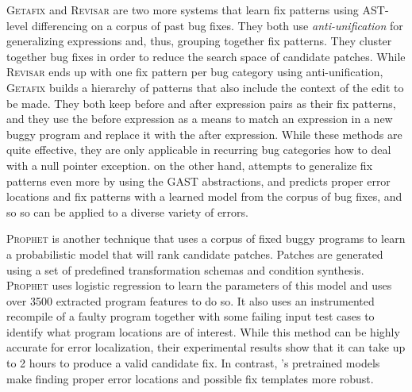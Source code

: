 \textsc{Getafix} \citep{Bader_2019} and 
\textsc{Revisar} \citep{Rolim_2018} are
two more systems that learn fix patterns 
using AST-level differencing on a corpus 
of past bug fixes. 
%
They both use \emph{anti-unification}
\citep{Kutsia_2014} for generalizing 
expressions and, thus, grouping together
fix patterns. 
%
They cluster together bug fixes in order 
to reduce the search space of candidate 
patches. 
%
While \textsc{Revisar} \citep{Rolim_2018} 
ends up with one fix pattern per bug category 
using anti-unification, \textsc{Getafix}
\citep{Bader_2019} builds a hierarchy of 
patterns that also include the context
of the edit to be made. 
%
They both keep before and after expression pairs as
their fix patterns, and they use the before expression 
as a means to match an expression in a new buggy program 
and replace it with the after expression.
%
While these methods are quite effective, 
they are only applicable in recurring
bug categories \eg how to deal with a 
null pointer exception. 
%
\toolname on the other hand, attempts 
to generalize fix patterns even more by 
using the GAST abstractions, and predicts 
proper error locations and fix patterns 
with a learned model from the corpus of 
bug fixes, and so so can be applied to a
diverse variety of errors.

\textsc{Prophet} \citep{Long_2016} is another technique that uses a corpus of
fixed buggy programs to learn a probabilistic model that will rank candidate
patches. Patches are generated using a set of predefined transformation schemas
and condition synthesis. \textsc{Prophet} uses logistic regression to learn the
parameters of this model and uses over 3500 extracted program features to do so.
It also uses an instrumented recompile of a faulty program together with some
failing input test cases to identify what program locations are of interest.
While this method can be highly accurate for error localization, their
experimental results show that it can take up to 2 hours to produce a valid
candidate fix. In contrast, \toolname's pretrained models make finding proper
error locations and possible fix templates more robust.
